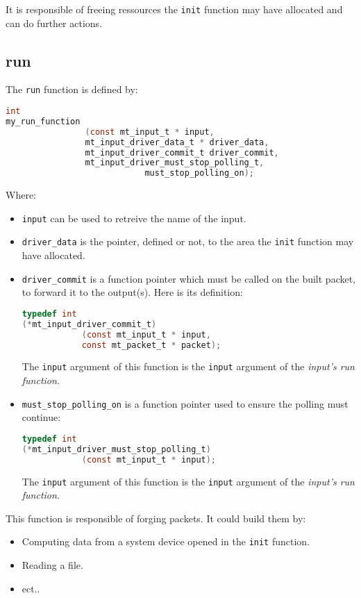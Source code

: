 It is responsible of freeing ressources the \texttt{init} function 
may have allocated and can do further actions. 

%
%
\subsection{run}
\label{sect:input_run}
The \texttt{run} function is defined by:
\begin{lstlisting}[language=C,
caption=Input's run function prototype]
int 
my_run_function
                (const mt_input_t * input,
                mt_input_driver_data_t * driver_data,
                mt_input_driver_commit_t driver_commit,
                mt_input_driver_must_stop_polling_t, 
                            must_stop_polling_on);
\end{lstlisting}
Where:
\begin{itemize}
\item \texttt{input} can be used to retreive the name of the input.
\item \texttt{driver\_data} is the pointer, defined or not, to the
area the \texttt{init} function may have allocated.
\item \texttt{driver\_commit} is a function pointer which must be called on 
the built packet, to forward it to the output(s). Here is its definition:
\begin{lstlisting}[language=C,
caption=Input's commit function pointer definition]
typedef int
(*mt_input_driver_commit_t)
            (const mt_input_t * input,
            const mt_packet_t * packet);
\end{lstlisting}
The \texttt{input} argument of this function is the \texttt{input} argument
of the \textit{input's run function}.
\item \texttt{must\_stop\_polling\_on} is a function pointer used to ensure
the polling must continue:
\begin{lstlisting}[language=C,
caption=Input's continuation test function pointer definition]
typedef int
(*mt_input_driver_must_stop_polling_t)
            (const mt_input_t * input);
\end{lstlisting}
The \texttt{input} argument of this function is the \texttt{input} argument
of the \textit{input's run function}.
\end{itemize}

This function is responsible of forging packets. It could build them by:
\begin{itemize}
\item Computing data from a system device opened in the \texttt{init} function.
\item Reading a file.
\item ect..
\end{itemize}

